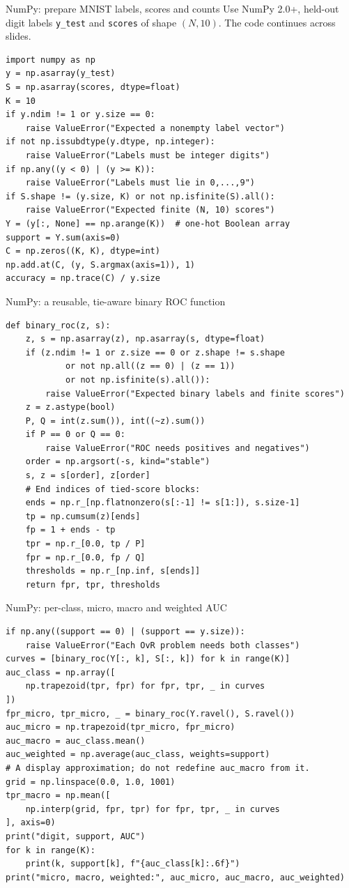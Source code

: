 \documentclass[aspectratio=169,11pt]{beamer}
\begin{document}
\begin{frame}[fragile]{NumPy: prepare MNIST labels, scores and counts}
\small
Use NumPy 2.0+, held-out digit labels \texttt{y\_test} and \texttt{scores}
of shape $(N,10)$. The code continues across slides.
\begin{lstlisting}
import numpy as np
y = np.asarray(y_test)
S = np.asarray(scores, dtype=float)
K = 10
if y.ndim != 1 or y.size == 0:
    raise ValueError("Expected a nonempty label vector")
if not np.issubdtype(y.dtype, np.integer):
    raise ValueError("Labels must be integer digits")
if np.any((y < 0) | (y >= K)):
    raise ValueError("Labels must lie in 0,...,9")
if S.shape != (y.size, K) or not np.isfinite(S).all():
    raise ValueError("Expected finite (N, 10) scores")
Y = (y[:, None] == np.arange(K))  # one-hot Boolean array
support = Y.sum(axis=0)
C = np.zeros((K, K), dtype=int)
np.add.at(C, (y, S.argmax(axis=1)), 1)
accuracy = np.trace(C) / y.size
\end{lstlisting}
\end{frame}

\begin{frame}[fragile]{NumPy: a reusable, tie-aware binary ROC function}
\begin{lstlisting}
def binary_roc(z, s):
    z, s = np.asarray(z), np.asarray(s, dtype=float)
    if (z.ndim != 1 or z.size == 0 or z.shape != s.shape
            or not np.all((z == 0) | (z == 1))
            or not np.isfinite(s).all()):
        raise ValueError("Expected binary labels and finite scores")
    z = z.astype(bool)
    P, Q = int(z.sum()), int((~z).sum())
    if P == 0 or Q == 0:
        raise ValueError("ROC needs positives and negatives")
    order = np.argsort(-s, kind="stable")
    s, z = s[order], z[order]
    # End indices of tied-score blocks:
    ends = np.r_[np.flatnonzero(s[:-1] != s[1:]), s.size-1]
    tp = np.cumsum(z)[ends]
    fp = 1 + ends - tp
    tpr = np.r_[0.0, tp / P]
    fpr = np.r_[0.0, fp / Q]
    thresholds = np.r_[np.inf, s[ends]]
    return fpr, tpr, thresholds
\end{lstlisting}
\end{frame}

\begin{frame}[fragile]{NumPy: per-class, micro, macro and weighted AUC}
\begin{lstlisting}
if np.any((support == 0) | (support == y.size)):
    raise ValueError("Each OvR problem needs both classes")
curves = [binary_roc(Y[:, k], S[:, k]) for k in range(K)]
auc_class = np.array([
    np.trapezoid(tpr, fpr) for fpr, tpr, _ in curves
])
fpr_micro, tpr_micro, _ = binary_roc(Y.ravel(), S.ravel())
auc_micro = np.trapezoid(tpr_micro, fpr_micro)
auc_macro = auc_class.mean()
auc_weighted = np.average(auc_class, weights=support)
# A display approximation; do not redefine auc_macro from it.
grid = np.linspace(0.0, 1.0, 1001)
tpr_macro = np.mean([
    np.interp(grid, fpr, tpr) for fpr, tpr, _ in curves
], axis=0)
print("digit, support, AUC")
for k in range(K):
    print(k, support[k], f"{auc_class[k]:.6f}")
print("micro, macro, weighted:", auc_micro, auc_macro, auc_weighted)
\end{lstlisting}
\end{frame}
\end{document}
